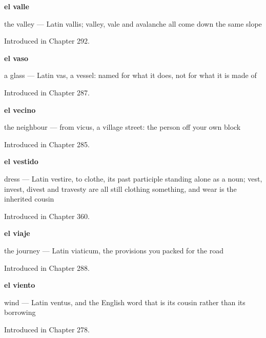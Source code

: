 \noindent\begin{minipage}[t]{\linewidth}
\raggedright
\textbf{el valle}\par
\small the valley — Latin vallis; valley, vale and avalanche all come down the same slope\par
\footnotesize Introduced in Chapter 292.
\end{minipage}\par\medskip

\noindent\begin{minipage}[t]{\linewidth}
\raggedright
\textbf{el vaso}\par
\small a glass — Latin vas, a vessel: named for what it does, not for what it is made of\par
\footnotesize Introduced in Chapter 287.
\end{minipage}\par\medskip

\noindent\begin{minipage}[t]{\linewidth}
\raggedright
\textbf{el vecino}\par
\small the neighbour — from vicus, a village street: the person off your own block\par
\footnotesize Introduced in Chapter 285.
\end{minipage}\par\medskip

\noindent\begin{minipage}[t]{\linewidth}
\raggedright
\textbf{el vestido}\par
\small dress — Latin vestire, to clothe, its past participle standing alone as a noun; vest, invest, divest and travesty are all still clothing something, and wear is the inherited cousin\par
\footnotesize Introduced in Chapter 360.
\end{minipage}\par\medskip

\noindent\begin{minipage}[t]{\linewidth}
\raggedright
\textbf{el viaje}\par
\small the journey — Latin viaticum, the provisions you packed for the road\par
\footnotesize Introduced in Chapter 288.
\end{minipage}\par\medskip

\noindent\begin{minipage}[t]{\linewidth}
\raggedright
\textbf{el viento}\par
\small wind — Latin ventus, and the English word that is its cousin rather than its borrowing\par
\footnotesize Introduced in Chapter 278.
\end{minipage}\par\medskip

